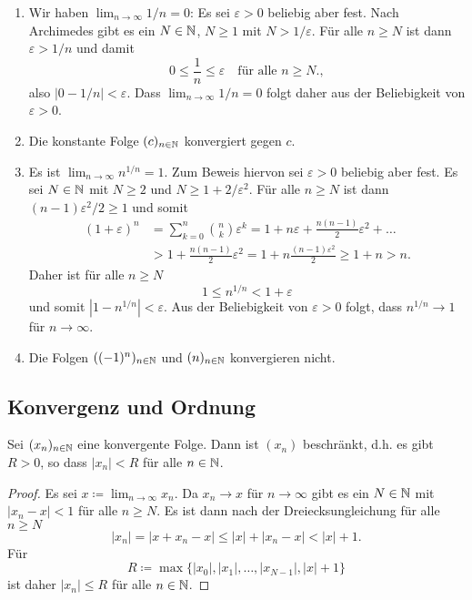 \documentclass[a4paper,10pt]{article}
\begin{document}
\begin{bsp}
 \begin{enumerate}
  \item
   Wir haben $\lim_{n \to \infty} 1/n = 0$: Es sei $\varepsilon > 0$ beliebig aber fest. Nach Archimedes gibt es ein $N \in \mathbb{N}$, $N \geq 1$ mit $N > 1/\varepsilon$. Für alle $n \geq N$ ist dann $\varepsilon > 1/n$ und damit
   \[
    0 \leq \frac{1}{n} \leq \varepsilon \quad \text{für alle $n \geq N$}.,
   \]
   also $|0 - 1/n| < \varepsilon$. Dass $\lim_{n \to \infty} 1/n = 0$ folgt daher aus der Beliebigkeit von $\varepsilon > 0$.
  \item
   Die konstante Folge $(c)_{n \in \mathbb{N}}$ konvergiert gegen $c$.
  \item
   Es ist $\lim_{n \to \infty} n^{1/n} = 1$. Zum Beweis hiervon sei $\varepsilon > 0$ beliebig aber fest. Es sei $N \in \mathbb{N}$ mit $N \geq 2$ und $N \geq 1 + 2/\varepsilon^2$. Für alle $n \geq N$ ist dann $(n-1)\varepsilon^2/2 \geq 1$ und somit
   \begin{align*}
    (1+\varepsilon)^n
    &= \sum_{k=0}^n \binom{n}{k} \varepsilon^k
    = 1 + n \varepsilon + \frac{n(n-1)}{2}\varepsilon^2 + \dotso \\
    &> 1 + \frac{n(n-1)}{2}\varepsilon^2
    = 1 + n \frac{(n-1)\varepsilon^2}{2}
    \geq 1 + n
    > n.
   \end{align*}
  Daher ist für alle $n \geq N$
  \[
   1 \leq n^{1/n} < 1 + \varepsilon
  \]
  und somit $|1 - n^{1/n}| < \varepsilon$. Aus der Beliebigkeit von $\varepsilon > 0$ folgt, dass $n^{1/n} \to 1$ für $n \to \infty$.
 \item
  Die Folgen $((-1)^n)_{n \in \mathbb{N}}$ und $(n)_{n \in \mathbb{N}}$ konvergieren nicht.
 \end{enumerate}
\end{bsp}





\subsection{Konvergenz und Ordnung}


\begin{lem}
 Sei $(x_n)_{n \in \mathbb{N}}$ eine konvergente Folge. Dann ist $(x_n)$ beschränkt, d.h. es gibt $R > 0$, so dass $|x_n| < R$ für alle $n \in \mathbb{N}$.
\end{lem}
\begin{proof}
 Es sei $x \coloneqq \lim_{n \to \infty} x_n$. Da $x_n \to x$ für $n \to \infty$ gibt es ein $N \in \mathbb{N}$ mit $|x_n - x| < 1$ für alle $n \geq N$. Es ist dann nach der Dreiecksungleichung für alle $n \geq N$
 \[
  |x_n|
  = |x + x_n - x|
  \leq |x| + |x_n - x|
  < |x| + 1.
 \]
 Für
 \[
  R \coloneqq \max \{|x_0|, |x_1|, \dotsc, |x_{N-1}|, |x| + 1\}
 \]
 ist daher $|x_n| \leq R$ für alle $n \in \mathbb{N}$.
\end{proof}
\end{document}
